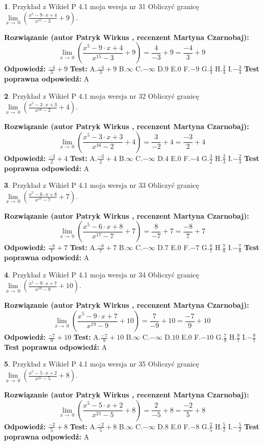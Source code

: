\documentclass[12pt, a4paper]{article}
\theoremstyle{definition} %
\newtheorem{zad}{}
\newcommand{\zadStart}[1]{\begin{zad}#1\newline}
\newcommand{\zadStop}{\end{zad}}
\newcommand{\rozwStart}[2]{\noindent \textbf{Rozwiązanie (autor #1 , recenzent #2): }\newline}
\newcommand{\rozwStop}{\newline}
\newcommand{\odpStart}{\noindent \textbf{Odpowiedź:}\newline}
\newcommand{\odpStop}{\newline}
\newcommand{\testStart}{\noindent \textbf{Test:}\newline}
\newcommand{\testStop}{\newline}
\newcommand{\kluczStart}{\noindent \textbf{Test poprawna odpowiedź:}\newline}
\newcommand{\kluczStop}{\newline}
\begin{document}
\zadStart{Przykład z Wikieł P 4.1 moja wersja nr 31}
Obliczyć granicę $\lim\limits_{x\to\ 0}(\frac{x^{5}-9 \cdot x +4}{x^{15}-3}+9)$.
\zadStop
\rozwStart{Patryk Wirkus}{Martyna Czarnobaj}
$$\lim\limits_{x\to\ 0}(\frac{x^{5}-9 \cdot x +4}{x^{15}-3}+9)=\frac{4}{-3}+9=\frac{-4}{3}+9$$
\rozwStop
\odpStart
$\frac{-4}{3}+9$
\odpStop
\testStart
A.$\frac{-4}{3}+9$
B.$\infty$
C.$-\infty$
D.$9$
E.$0$
F.$-9$
G.$\frac{4}{3}$
H.$\frac{3}{4}$
I.$-\frac{3}{4}$
\testStop
\kluczStart
A
\kluczStop



\zadStart{Przykład z Wikieł P 4.1 moja wersja nr 32}
Obliczyć granicę $\lim\limits_{x\to\ 0}(\frac{x^{5}-3 \cdot x +3}{x^{16}-2}+4)$.
\zadStop
\rozwStart{Patryk Wirkus}{Martyna Czarnobaj}
$$\lim\limits_{x\to\ 0}(\frac{x^{5}-3 \cdot x +3}{x^{16}-2}+4)=\frac{3}{-2}+4=\frac{-3}{2}+4$$
\rozwStop
\odpStart
$\frac{-3}{2}+4$
\odpStop
\testStart
A.$\frac{-3}{2}+4$
B.$\infty$
C.$-\infty$
D.$4$
E.$0$
F.$-4$
G.$\frac{3}{2}$
H.$\frac{2}{3}$
I.$-\frac{2}{3}$
\testStop
\kluczStart
A
\kluczStop



\zadStart{Przykład z Wikieł P 4.1 moja wersja nr 33}
Obliczyć granicę $\lim\limits_{x\to\ 0}(\frac{x^{5}-6 \cdot x +8}{x^{17}-7}+7)$.
\zadStop
\rozwStart{Patryk Wirkus}{Martyna Czarnobaj}
$$\lim\limits_{x\to\ 0}(\frac{x^{5}-6 \cdot x +8}{x^{17}-7}+7)=\frac{8}{-7}+7=\frac{-8}{7}+7$$
\rozwStop
\odpStart
$\frac{-8}{7}+7$
\odpStop
\testStart
A.$\frac{-8}{7}+7$
B.$\infty$
C.$-\infty$
D.$7$
E.$0$
F.$-7$
G.$\frac{8}{7}$
H.$\frac{7}{8}$
I.$-\frac{7}{8}$
\testStop
\kluczStart
A
\kluczStop



\zadStart{Przykład z Wikieł P 4.1 moja wersja nr 34}
Obliczyć granicę $\lim\limits_{x\to\ 0}(\frac{x^{5}-9 \cdot x +7}{x^{19}-9}+10)$.
\zadStop
\rozwStart{Patryk Wirkus}{Martyna Czarnobaj}
$$\lim\limits_{x\to\ 0}(\frac{x^{5}-9 \cdot x +7}{x^{19}-9}+10)=\frac{7}{-9}+10=\frac{-7}{9}+10$$
\rozwStop
\odpStart
$\frac{-7}{9}+10$
\odpStop
\testStart
A.$\frac{-7}{9}+10$
B.$\infty$
C.$-\infty$
D.$10$
E.$0$
F.$-10$
G.$\frac{7}{9}$
H.$\frac{9}{7}$
I.$-\frac{9}{7}$
\testStop
\kluczStart
A
\kluczStop



\zadStart{Przykład z Wikieł P 4.1 moja wersja nr 35}
Obliczyć granicę $\lim\limits_{x\to\ 0}(\frac{x^{5}-5 \cdot x +2}{x^{21}-5}+8)$.
\zadStop
\rozwStart{Patryk Wirkus}{Martyna Czarnobaj}
$$\lim\limits_{x\to\ 0}(\frac{x^{5}-5 \cdot x +2}{x^{21}-5}+8)=\frac{2}{-5}+8=\frac{-2}{5}+8$$
\rozwStop
\odpStart
$\frac{-2}{5}+8$
\odpStop
\testStart
A.$\frac{-2}{5}+8$
B.$\infty$
C.$-\infty$
D.$8$
E.$0$
F.$-8$
G.$\frac{2}{5}$
H.$\frac{5}{2}$
I.$-\frac{5}{2}$
\testStop
\kluczStart
A
\kluczStop
\end{document}
